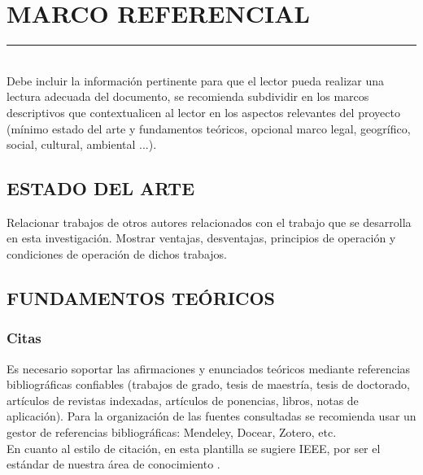\section{MARCO REFERENCIAL}
\rule{\textwidth}{1pt}\\

Debe incluir la información pertinente para que el lector pueda realizar una lectura adecuada del documento, se recomienda subdividir en los marcos descriptivos que contextualicen al lector en los aspectos relevantes del proyecto (mínimo estado del arte y fundamentos teóricos, opcional marco legal, geogrífico, social, cultural, ambiental ...).
\subsection{ESTADO DEL ARTE}
Relacionar trabajos de otros autores relacionados con el trabajo que se desarrolla en esta investigación. Mostrar ventajas, desventajas, principios de operación y condiciones de operación de dichos trabajos.
\subsection{FUNDAMENTOS TEÓRICOS}
\subsubsection{Citas}
Es necesario soportar las afirmaciones y enunciados teóricos mediante referencias bibliográficas confiables (trabajos de grado, tesis de maestría, tesis de doctorado, artículos de revistas indexadas, artículos de ponencias, libros, notas de aplicación). Para la organización de las fuentes consultadas se recomienda usar un gestor de referencias bibliográficas: Mendeley, Docear, Zotero, etc.\\
En cuanto al estilo de citación, en esta plantilla se sugiere IEEE, por ser el estándar de nuestra área de conocimiento \cite{Chaparro}.
